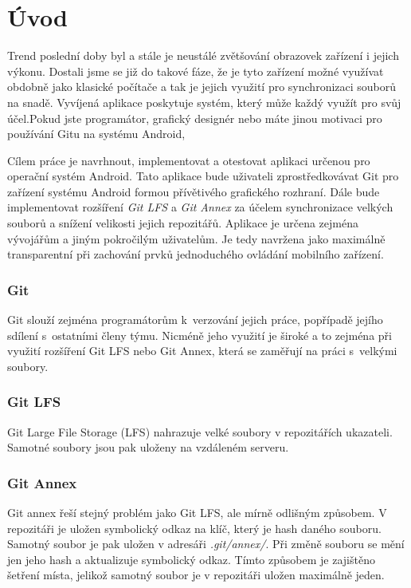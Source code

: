 \chapter{Úvod}
Trend poslední doby byl a stále je neustálé zvětšování obrazovek zařízení i jejich výkonu. Dostali jsme se již do takové fáze, že je tyto zařízení možné využívat obdobně jako klasické počítače a tak je jejich využití pro synchronizaci souborů na snadě.
Vyvíjená aplikace poskytuje systém, který může každý využít pro svůj účel.Pokud jste programátor, grafický designér nebo máte jinou motivaci pro používání Gitu na systému Android, 

Cílem práce je navrhnout, implementovat a otestovat aplikaci určenou pro operační systém Android. Tato aplikace bude uživateli zprostředkovávat Git pro zařízení systému Android formou přívětivého grafického rozhraní. Dále bude implementovat rozšíření \emph{Git LFS} a \emph{Git Annex} za účelem synchronizace velkých souborů a snížení velikosti jejich repozitářů. Aplikace je určena zejména vývojářům a jiným pokročilým uživatelům. Je tedy navržena jako maximálně transparentní při zachování prvků jednoduchého ovládání mobilního zařízení. 

\subsection {Git}
Git slouží zejména programátorům k verzování jejich práce, popřípadě jejího sdílení s ostatními členy týmu. Nicméně jeho využití je široké a to zejména při využití rozšíření Git LFS nebo Git Annex, která se zaměřují na práci s velkými soubory.

\subsection{Git LFS}
Git Large File Storage (LFS) nahrazuje velké soubory v repozitářích ukazateli. Samotné soubory jsou pak uloženy na vzdáleném serveru.

\subsection{Git Annex}
Git annex řeší stejný problém jako Git LFS, ale mírně odlišným způsobem. V repozitáři je uložen symbolický odkaz na klíč, který je hash daného souboru. Samotný soubor je pak uložen v adresáři \emph{.git/annex/}. Při změně souboru se mění jen jeho hash a aktualizuje symbolický odkaz. Tímto způsobem je zajištěno šetření místa, jelikož samotný soubor je v repozitáři uložen maximálně jeden.


